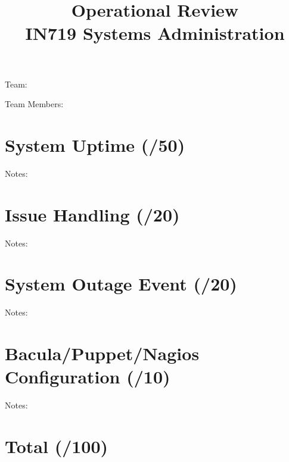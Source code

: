 \documentclass{article}   	%
\title{Operational Review\\ IN719 Systems Administration}
\date{}							%
\begin{document}
\maketitle

Team:

\vspace{5 mm}
Team Members:

\vspace{5 mm}

\section{System Uptime  (\underline{\hspace{1cm}}/50)}
Notes:

\vspace{3 cm}


\section{Issue Handling  (\underline{\hspace{1cm}}/20)}
Notes:

\newpage

\section{System Outage Event (\underline{\hspace{1 cm}}/20)}
Notes:

\vspace{7 cm}

\section{Bacula/Puppet/Nagios Configuration (\underline{\hspace{1 cm}}/10)}
Notes:

\vspace{7 cm}

\section*{Total (\underline{\hspace{1 cm}}/100)}
\end{document}
